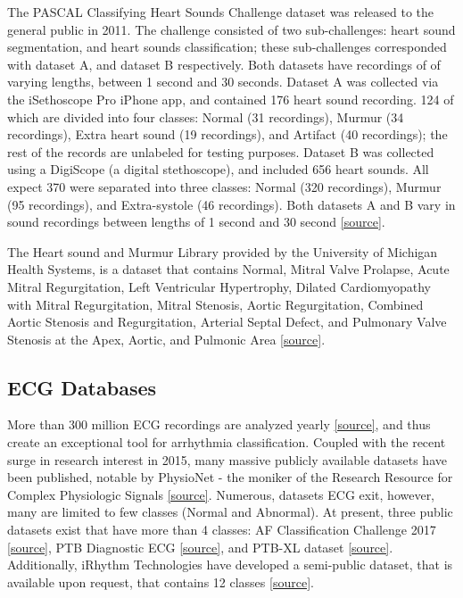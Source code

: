 \documentclass{article}
\begin{document}
The PASCAL Classifying Heart Sounds Challenge dataset was released to the general public in 2011. The challenge consisted of two sub-challenges: heart sound segmentation, and heart sounds classification; these sub-challenges corresponded with dataset A, and dataset B respectively. Both datasets have recordings of of varying lengths, between 1 second and 30 seconds. Dataset A was collected via the iSethoscope Pro iPhone app, and contained 176 heart sound recording. 124 of which are divided into four classes: Normal (31 recordings), Murmur (34 recordings), Extra heart sound (19 recordings), and Artifact (40 recordings); the rest of the records are unlabeled for testing purposes. Dataset B was collected using a DigiScope (a digital stethoscope), and included 656 heart sounds. All expect 370 were separated into three classes: Normal (320 recordings), Murmur (95 recordings), and Extra-systole (46 recordings). Both datasets A and B vary in sound recordings  between lengths of 1 second and 30 second \href{http://www.peterjbentley.com/heartchallenge/}{[source]}.

The Heart sound and Murmur Library provided by the University of Michigan Health Systems, is a dataset that contains Normal, Mitral Valve Prolapse, Acute Mitral Regurgitation, Left Ventricular Hypertrophy, Dilated Cardiomyopathy with Mitral Regurgitation, Mitral Stenosis, Aortic Regurgitation, Combined Aortic Stenosis and Regurgitation, Arterial Septal Defect, and Pulmonary Valve Stenosis at the Apex, Aortic, and Pulmonic Area \href{http://www.med.umich.edu/lrc/psb_open/html/repo/primer_heartsound/primer_heartsound.html}{[source]}.

\subsection{ECG Databases}
More than 300 million ECG recordings are analyzed yearly \href{https://pubmed.ncbi.nlm.nih.gov/10516892/}{[source]}, and thus create an exceptional tool for arrhythmia classification. Coupled with the recent surge in research interest in 2015, many massive publicly available datasets have been published, notable by PhysioNet - the moniker of the Research Resource for Complex Physiologic Signals \href{https://physionet.org/about/}{[source]}. Numerous, datasets ECG exit, however, many are limited to few classes (Normal and Abnormal). At present, three public datasets exist that have more than 4 classes: AF Classification Challenge 2017 \href{https://physionet.org/content/challenge-2017/1.0.0/)}{[source]}, PTB Diagnostic ECG \href{https://www.physionet.org/content/ptbdb/1.0.0/)}{[source]}, and PTB-XL dataset \href{https://physionet.org/content/ptb-xl/1.0.1/)}{[source]}. Additionally, iRhythm Technologies have developed a semi-public dataset, that is available upon request, that contains 12 classes \href{https://www.nature.com/articles/s41591-018-0268-3}{[source]}.
\end{document}
